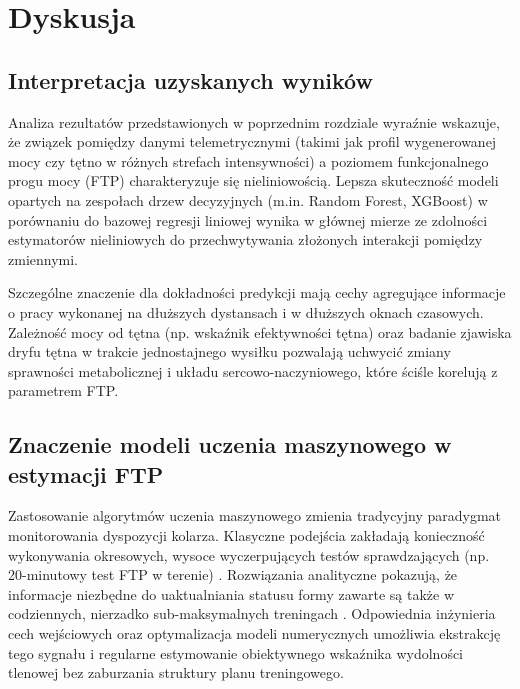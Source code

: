 \chapter{Dyskusja}

\section{Interpretacja uzyskanych wyników}
Analiza rezultatów przedstawionych w poprzednim rozdziale wyraźnie wskazuje, że związek pomiędzy danymi telemetrycznymi (takimi jak profil wygenerowanej mocy czy tętno w różnych strefach intensywności) a poziomem funkcjonalnego progu mocy (FTP) charakteryzuje się nieliniowością. Lepsza skuteczność modeli opartych na zespołach drzew decyzyjnych (m.in. Random Forest, XGBoost) w porównaniu do bazowej regresji liniowej wynika w głównej mierze ze zdolności estymatorów nieliniowych do przechwytywania złożonych interakcji pomiędzy zmiennymi. 

Szczególne znaczenie dla dokładności predykcji mają cechy agregujące informacje o pracy wykonanej na dłuższych dystansach i w dłuższych oknach czasowych. Zależność mocy od tętna (np. wskaźnik efektywności tętna) oraz badanie zjawiska dryfu tętna w trakcie jednostajnego wysiłku pozwalają uchwycić zmiany sprawności metabolicznej i układu sercowo-naczyniowego, które ściśle korelują z parametrem FTP.

\section{Znaczenie modeli uczenia maszynowego w estymacji FTP}
Zastosowanie algorytmów uczenia maszynowego zmienia tradycyjny paradygmat monitorowania dyspozycji kolarza. Klasyczne podejścia zakładają konieczność wykonywania okresowych, wysoce wyczerpujących testów sprawdzających (np. 20-minutowy test FTP w terenie) \cite{sitko2023_ac20to60_update}. Rozwiązania analityczne pokazują, że informacje niezbędne do uaktualniania statusu formy zawarte są także w codziennych, nierzadko sub-maksymalnych treningach \cite{phasescycling2023_ftp_variability}. Odpowiednia inżynieria cech wejściowych oraz optymalizacja modeli numerycznych umożliwia ekstrakcję tego sygnału i regularne estymowanie obiektywnego wskaźnika wydolności tlenowej bez zaburzania struktury planu treningowego.

